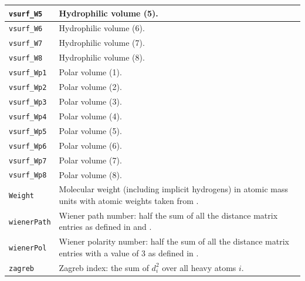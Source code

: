 \documentclass[12pt,a4paper]{article}
\begin{document}
\begin{longtable}{@{\zz}|p{}|p{}|}
\texttt{vsurf\_W5} & Hydrophilic volume (5).\\ \hline

\texttt{vsurf\_W6} & Hydrophilic volume (6).\\ \hline

\texttt{vsurf\_W7} & Hydrophilic volume (7).\\ \hline

\texttt{vsurf\_W8} & Hydrophilic volume (8).\\ \hline

\texttt{vsurf\_Wp1} & Polar volume (1).\\ \hline

\texttt{vsurf\_Wp2} & Polar volume (2).\\ \hline

\texttt{vsurf\_Wp3} & Polar volume (3).\\ \hline

\texttt{vsurf\_Wp4} & Polar volume (4).\\ \hline

\texttt{vsurf\_Wp5} & Polar volume (5).\\ \hline

\texttt{vsurf\_Wp6} & Polar volume (6).\\ \hline

\texttt{vsurf\_Wp7} & Polar volume (7).\\ \hline

\texttt{vsurf\_Wp8} & Polar volume (8).\\ \hline

\texttt{Weight} & Molecular weight (including implicit hydrogens) in 
atomic mass units with atomic weights taken from \cite{CRC1994}.\\ \hline

\texttt{wienerPath} & Wiener path number: half the sum of all the 
distance matrix entries as defined in \cite{Balaban1979} and 
\cite{Wiener1947}.\\ \hline

\texttt{wienerPol} & Wiener polarity number: half the sum of all 
the distance matrix entries with a value of 3 as defined in 
\cite{Balaban1979}.\\ \hline

\texttt{zagreb} & Zagreb index: the sum of $d_i^2$ over all heavy 
atoms $i$.\\ \hline

\end{longtable}



\end{document}
